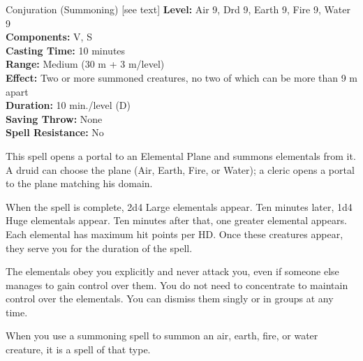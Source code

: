 {Conjuration (Summoning) [see text]}
{
	\textbf{Level:}
	Air 9, Drd 9, Earth 9, Fire 9, Water 9\\
	\textbf{Components:}
	V, S\\
	\textbf{Casting Time:}
	10 minutes\\
	\textbf{Range:}
	Medium (30 m + 3 m/level)\\
	\textbf{Effect:}
	Two or more summoned creatures, no two of which can be more than 9 m apart\\
	\textbf{Duration:}
	10 min./level (D)\\
	\textbf{Saving Throw:}
	None\\
	\textbf{Spell Resistance:}
	No\\
}
{
	This spell opens a portal to an Elemental Plane and summons elementals from it. A druid can choose the plane (Air, Earth, Fire, or Water); a cleric opens a portal to the plane matching his domain.

	When the spell is complete, 2d4 Large elementals appear. Ten minutes later, 1d4 Huge elementals appear. Ten minutes after that, one greater elemental appears. Each elemental has maximum hit points per HD. Once these creatures appear, they serve you for the duration of the spell.

	The elementals obey you explicitly and never attack you, even if someone else manages to gain control over them. You do not need to concentrate to maintain control over the elementals. You can dismiss them singly or in groups at any time.

	When you use a summoning spell to summon an air, earth, fire, or water creature, it is a spell of that type.

}
